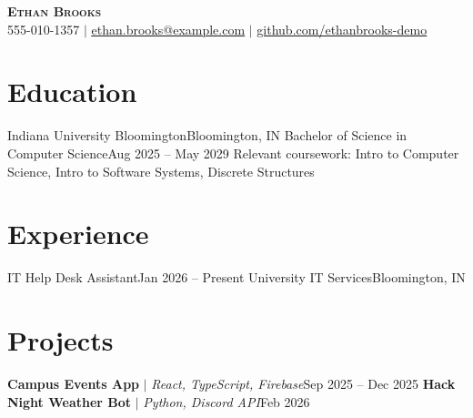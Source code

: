 

\begin{center}
    \textbf{\Huge \scshape Ethan Brooks} \\ \vspace{1pt}
    \small 555-010-1357 $|$ \href{mailto:ethan.brooks@example.com}{\underline{ethan.brooks@example.com}} $|$
    \href{https://github.com/ethanbrooks-demo}{\underline{github.com/ethanbrooks-demo}}
\end{center}

\section{Education}
  \resumeSubHeadingListStart
    \resumeSubheading
      {Indiana University Bloomington}{Bloomington, IN}
      {Bachelor of Science in Computer Science}{Aug 2025 -- May 2029}
  \resumeSubHeadingListEnd
  \small{Relevant coursework: Intro to Computer Science, Intro to Software Systems, Discrete Structures}

\section{Experience}
  \resumeSubHeadingListStart
    \resumeSubheading
      {IT Help Desk Assistant}{Jan 2026 -- Present}
      {University IT Services}{Bloomington, IN}
      \resumeItemListStart
      \resumeItemListEnd
  \resumeSubHeadingListEnd

\section{Projects}
    \resumeSubHeadingListStart
      \resumeProjectHeading
          {\textbf{Campus Events App} $|$ \emph{React, TypeScript, Firebase}}{Sep 2025 -- Dec 2025}
          \resumeItemListStart
          \resumeItemListEnd
      \resumeProjectHeading
          {\textbf{Hack Night Weather Bot} $|$ \emph{Python, Discord API}}{Feb 2026}
          \resumeItemListStart
          \resumeItemListEnd
    \resumeSubHeadingListEnd

